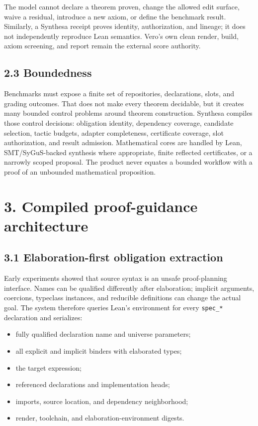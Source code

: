 \documentclass[
  10pt,
]{article}
\providecommand{\tightlist}{%
  \setlength{\itemsep}{0pt}\setlength{\parskip}{0pt}}
\begin{document}
The model cannot declare a theorem proven, change the allowed edit
surface, waive a residual, introduce a new axiom, or define the
benchmark result. Similarly, a Synthesa receipt proves identity,
authorization, and lineage; it does not independently reproduce Lean
semantics. Vero's own clean render, build, axiom screening, and report
remain the external score authority.

\subsection{2.3 Boundedness}\label{boundedness}

Benchmarks must expose a finite set of repositories, declarations,
slots, and grading outcomes. That does not make every theorem decidable,
but it creates many bounded control problems around theorem
construction. Synthesa compiles those control decisions: obligation
identity, dependency coverage, candidate selection, tactic budgets,
adapter completeness, certificate coverage, slot authorization, and
result admission. Mathematical cores are handled by Lean,
SMT/SyGuS-backed synthesis where appropriate, finite reflected
certificates, or a narrowly scoped proposal. The product never equates a
bounded workflow with a proof of an unbounded mathematical proposition.

\section{3. Compiled proof-guidance
architecture}\label{compiled-proof-guidance-architecture}

\subsection{3.1 Elaboration-first obligation
extraction}\label{elaboration-first-obligation-extraction}

Early experiments showed that source syntax is an unsafe proof-planning
interface. Names can be qualified differently after elaboration;
implicit arguments, coercions, typeclass instances, and reducible
definitions can change the actual goal. The system therefore queries
Lean's environment for every \texttt{spec\_*} declaration and
serializes:

\begin{itemize}
\tightlist
\item
  fully qualified declaration name and universe parameters;
\item
  all explicit and implicit binders with elaborated types;
\item
  the target expression;
\item
  referenced declarations and implementation heads;
\item
  imports, source location, and dependency neighborhood;
\item
  render, toolchain, and elaboration-environment digests.
\end{itemize}
\end{document}
